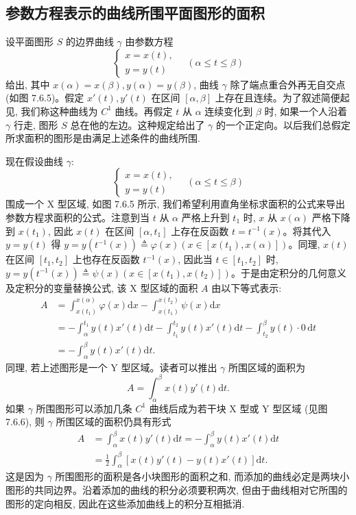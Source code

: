 \subsection{参数方程表示的曲线所围平面图形的面积}
\label{subsec:ma-7-6-2}

设平面图形 $S$ 的边界曲线 $\gamma$ 由参数方程
\[
  \begin{cases}
    x=x(t),\\
    y=y(t)
  \end{cases}
  \quad(\alpha\leq t\leq\beta)
\]
给出, 其中 $x(\alpha)=x(\beta),y(\alpha)=y(\beta)$, 曲线 $\gamma$ 除了端点重合外再无自交点 (如图 7.6.5)。假定 $x'(t),y'(t)$ 在区间 $[\alpha,\beta]$ 上存在且连续。为了叙述简便起见, 我们称这种曲线为 $C^1$ 曲线。再假定 $t$ 从 $\alpha$ 连续变化到 $\beta$ 时, 如果一个人沿着 $\gamma$ 行走, 图形 $S$ 总在他的左边。这种规定给出了 $\gamma$ 的一个正定向。以后我们总假定所求面积的图形是由满足上述条件的曲线所围.

现在假设曲线 $\gamma$:
\[
  \begin{cases}
    x=x(t),\\
    y=y(t)
  \end{cases}
  \quad(\alpha\leq t\leq\beta)
\]
围成一个 X 型区域, 如图 7.6.5 所示, 我们希望利用直角坐标求面积的公式来导出参数方程求面积的公式。注意到当 $t$ 从 $\alpha$ 严格上升到 $t_1$ 时, $x$ 从 $x(\alpha)$ 严格下降到 $x(t_1)$, 因此 $x(t)$ 在区间 $[\alpha,t_1]$ 上存在反函数 $t=t^{-1}(x)$。将其代入 $y=y(t)$ 得 $y=y(t^{-1}(x))\triangleq\varphi(x)(x\in[x(t_1),x(\alpha)])$。同理, $x(t)$ 在区间 $[t_1,t_2]$ 上也存在反函数 $t^{-1}(x)$, 因此当 $t\in[t_1,t_2]$ 时, $y=y(t^{-1}(x))\triangleq\psi(x)(x\in[x(t_1),x(t_2)])$。于是由定积分的几何意义及定积分的变量替换公式, 该 X 型区域的面积 $A$ 由以下等式表示:
\[
\begin{aligned}
  A&=\int_{x(t_1)}^{x(\alpha)}\varphi(x)\mathrm dx
  -\int_{x(t_1)}^{x(t_2)}\psi(x)\mathrm dx\\
  &=-\int_\alpha^{t_1}y(t)x'(t)\mathrm dt
  -\int_{t_1}^{t_2}y(t)x'(t)\mathrm dt
  -\int_{t_2}^{\beta}y(t)\cdot0\,\mathrm dt\\
  &=-\int_\alpha^\beta y(t)x'(t)\mathrm dt.
\end{aligned}
\]
同理, 若上述图形是一个 Y 型区域。读者可以推出 $\gamma$ 所围区域的面积为
\[
  A=\int_\alpha^\beta x(t)y'(t)\mathrm dt.
\]
如果 $\gamma$ 所围图形可以添加几条 $C^1$ 曲线后成为若干块 X 型或 Y 型区域 (见图 7.6.6), 则 $\gamma$ 所围区域的面积仍具有形式
\begin{equation}
\begin{aligned}
  A&=\int_\alpha^\beta x(t)y'(t)\mathrm dt
  =-\int_\alpha^\beta y(t)x'(t)\mathrm dt\\
  &=\frac{1}{2}\int_\alpha^\beta [x(t)y'(t)-y(t)x'(t)]\mathrm dt.
\end{aligned}
\label{eq:ma-7-6-4}
\end{equation}
这是因为 $\gamma$ 所围图形的面积是各小块图形的面积之和, 而添加的曲线必定是两块小图形的共同边界。沿着添加的曲线的积分必须要积两次, 但由于曲线相对它所围的图形的定向相反, 因此在这些添加曲线上的积分互相抵消.

